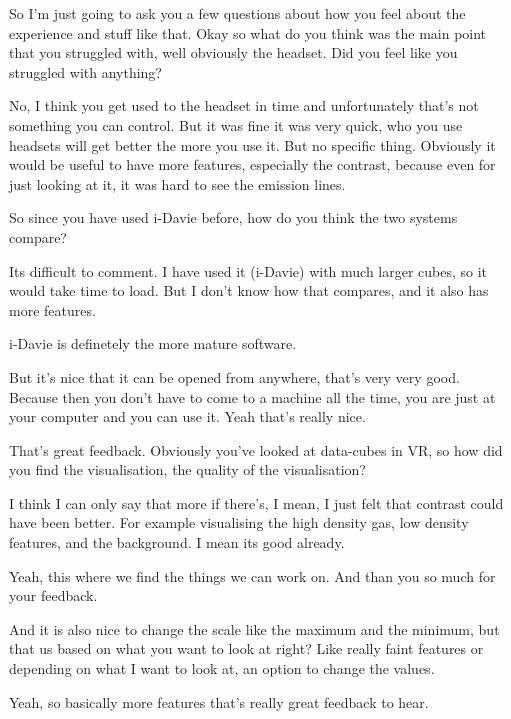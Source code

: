 \begin{description}
    \mich So I'm just going to ask you a few questions about how you feel about the experience and stuff like that. Okay so what do you think was the main point that you struggled with, well obviously the headset. Did you feel like you struggled with anything?
    
    \sushma No, I think you get used to the headset in time and unfortunately that's not something you can control. But it was fine it was very quick, who you use headsets will get better the more you use it. But no specific thing. Obviously it would be useful to have more features, especially the contrast, because even for just looking at it, it was hard to see the emission lines.
    
    \mich So since you have used i-Davie before, how do you think the two systems compare? 
    
    \sushma Its difficult to comment. I have used it (i-Davie) with much larger cubes, so it would take time to load. But I don't know how that compares, and it also has more features.
    
    \mich i-Davie is definetely the more mature software.
    
    \sushma But it's nice that it can be opened from anywhere, that's very very good. Because then you don't have to come to a machine all the time, you are just at your computer and you can use it. Yeah that's really nice.
    
    \mich That's great feedback. Obviously you've looked at data-cubes in VR, so how did you find the visualisation, the quality of the visualisation?
    
    \sushma I think I can only say that more if there's, I mean, I just felt that contrast could have been better. For example visualising the high density gas, low density features, and the background. I mean its good already.
    
    \mich Yeah, this where we find the things we can work on. And than you so much for your feedback.
    
    \sushma And it is also nice to change the scale like the maximum and the minimum, but that us based on what you want to look at right? Like really faint features or depending on what I want to look at, an option to change the values.
    
    \mich Yeah, so basically more features that's really great feedback to hear.
\end{description}